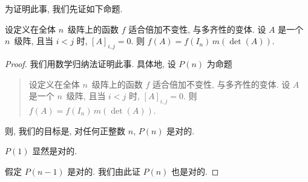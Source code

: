 \documentclass[../libro.tex]{subfiles}
\begin{document}
为证明此事, 我们先证如下命题.

\begin{theorem}
    设定义在全体 \(n\)~级阵上的函数 \(f\)
    适合倍加不变性, 与多齐性的变体.
    设 \(A\) 是一个 \(n\)~级阵,
    且当 \(i < j\) 时, \([A]_{i,j} = 0\).
    则 \(f(A) = f(I_n)\, m(\det {(A)})\).
\end{theorem}

\begin{proof}
    我们用数学归纳法证明此事.
    具体地, 设 \(P(n)\) 为命题
    \begin{quotation}
        设定义在全体 \(n\)~级阵上的函数 \(f\)
        适合倍加不变性, 与多齐性的变体.
        设 \(A\) 是一个 \(n\)~级阵,
        且当 \(i < j\) 时, \([A]_{i,j} = 0\).
        则 \(f(A) = f(I_n)\, m(\det {(A)})\).
    \end{quotation}
    则, 我们的目标是,
    对任何正整数 \(n\), \(P(n)\) 是对的.

    \(P(1)\) 显然是对的.

    假定 \(P(n-1)\) 是对的.
    我们由此证 \(P(n)\) 也是对的.


\end{proof}
\end{document}
